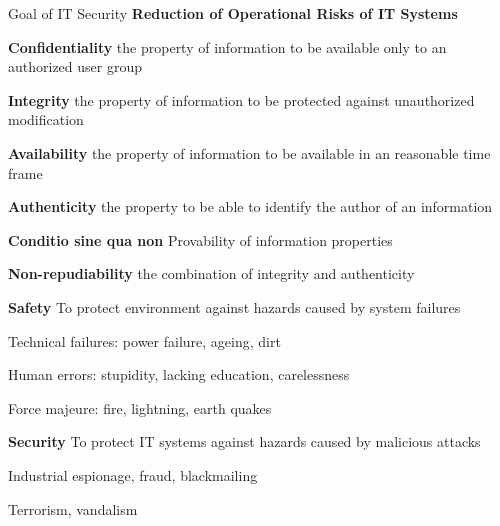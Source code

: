\documentclass[a4paper]{article}
\begin{document}
\raggedright
\begin{multicols}{3}\scriptsize
    \setlength{\premulticols}{1pt}
    \setlength{\postmulticols}{1pt}
    \setlength{\multicolsep}{1pt}
    \setlength{\columnsep}{2pt}

    Goal of IT Security \textbf{Reduction of Operational Risks of IT Systems}
    \begin{itemize*}
        \item \textbf{Confidentiality} the property of information to be available only to an authorized user group
        \item \textbf{Integrity} the property of information to be protected against unauthorized modification
        \item \textbf{Availability} the property of information to be available in an reasonable time frame
        \item \textbf{Authenticity} the property to be able to identify the author of an information
        \item \textbf{Conditio sine qua non} Provability of information properties
        \item \textbf{Non-repudiability} the combination of integrity and authenticity
        \item \textbf{Safety} To protect environment against hazards caused by system failures
        \begin{itemize*}
            \item Technical failures: power failure, ageing, dirt
            \item Human errors: stupidity, lacking education, carelessness
            \item Force majeure: fire, lightning, earth quakes
        \end{itemize*}
        \item \textbf{Security} To protect IT systems against hazards caused by malicious attacks
        \begin{itemize*}
            \item Industrial espionage, fraud, blackmailing
            \item Terrorism, vandalism
        \end{itemize*}
    \end{itemize*}


\end{multicols}
\end{document}
